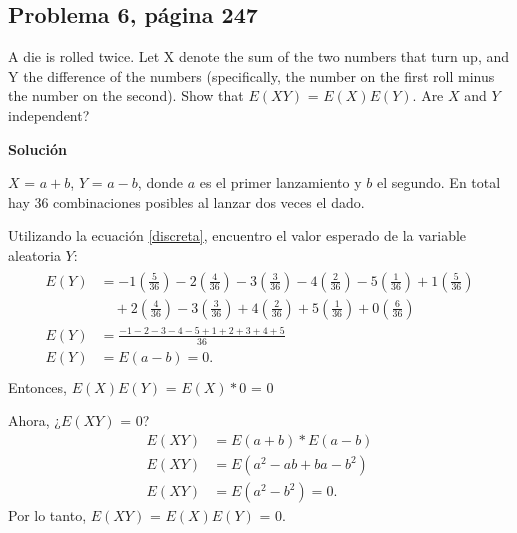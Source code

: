 \documentclass{article}
\begin{document}
\subsection{Problema 6, página 247}
A die is rolled twice. Let X denote the sum of the two numbers that turn up, and Y the difference of the numbers (specifically, the number on the first roll minus the number on the second). Show that $E(XY)$ = $E(X)E(Y)$. Are $X$ and $Y$ independent? 

\noindent \textbf{Solución}

\noindent $X$ = $a + b$, $Y$ = $a - b$, donde $a$ es el primer lanzamiento y $b$ el segundo. En total hay $36$ combinaciones posibles al lanzar dos veces el dado.

\noindent Utilizando la ecuación \ref{discreta}, encuentro el valor esperado de la variable aleatoria $Y$:
\begin{align}
\begin{split}
    \nonumber
    E{(Y)}  & = -1\left(\frac{5}{36}\right) - 2\left(\frac{4}{36} \right) - 3\left(\frac{3}{36}\right) - 4\left(\frac{2}{36}\right) -5\left(\frac{1}{36}\right)  + 1\left(\frac{5}{36}\right) \\ \nonumber
            & \quad + 2\left(\frac{4}{36} \right) - 3\left(\frac{3}{36}\right) + 4\left(\frac{2}{36}\right) + 5\left(\frac{1}{36}\right) + 0\left(\frac{6}{36}\right) \\ \nonumber
    E{(Y)}  & = \frac{-1-2-3-4-5+1+2+3+4+5}{36} \\ \nonumber
    E{(Y)}  & = E{(a-b)} = 0. \\ \nonumber
\end{split}
\end{align}
Entonces, $E(X)E(Y)$ = $E(X)*0$ = $0$

\noindent Ahora, ¿$E(XY)$ = $0$?
\begin{align}
    \nonumber
    E{(XY)} & = E{(a+b)}*E{(a-b)} \\ \nonumber
    E{(XY)} & = E{(a^2-ab+ba-b^2)} \\ \nonumber
    E{(XY)} & = E{(a^2-b^2)} = 0.
\end{align}
Por lo tanto,  $E(XY)$ = $E(X)E(Y)$ = $0$.
\end{document}
